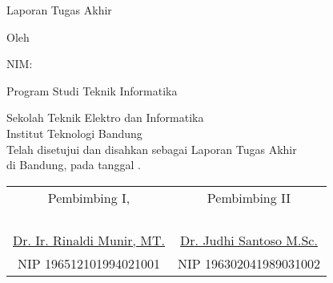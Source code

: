 \clearpage
\pagestyle{empty}

\begin{center}
\smallskip

    \Large \bfseries \MakeUppercase{\thetitle}
    \vfill

    \Large Laporan Tugas Akhir
    \vfill

    \large Oleh

    \Large \theauthor

    \Large NIM: \thestudentnumber

    \Large Program Studi Teknik Informatika

    \large \normalfont Sekolah Teknik Elektro dan Informatika \\
    Institut Teknologi Bandung \\

    \vfill
    \large \normalfont
    Telah disetujui dan disahkan sebagai Laporan Tugas Akhir
    \\[0.1em]
    di Bandung, pada tanggal \thedatedmy.

    \vfill
    \setlength{\tabcolsep}{12pt}
    \begin{tabular}{c@{\hskip 0.5in}c}
        Pembimbing I, & Pembimbing II \\
        & \\
        & \\
        & \\
        & \\
        \underline{Dr. Ir. Rinaldi Munir, MT.} & \underline{Dr. Judhi Santoso M.Sc.} \\
        NIP 196512101994021001 & NIP 196302041989031002 \\
    \end{tabular}

\end{center}
\clearpage
